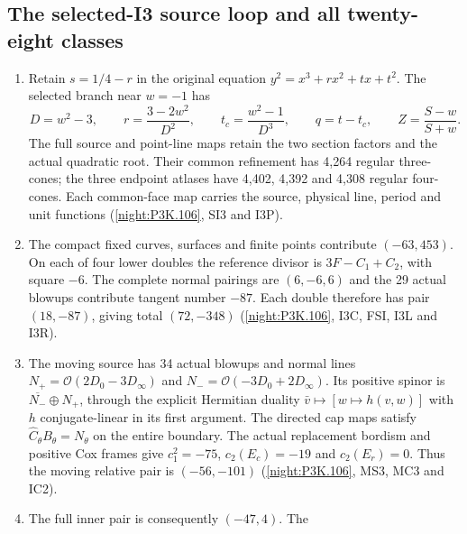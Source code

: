 \subsection{The selected-I3 source loop and all twenty-eight classes}
\RungOne
\begin{enumerate}[label=\arabic*.]
\item Retain $s=1/4-r$ in the original equation
  $y^2=x^3+rx^2+tx+t^2$. The selected branch near $w=-1$ has
  \[
  D=w^2-3,\qquad r=\frac{3-2w^2}{D^2},\qquad
  t_c=\frac{w^2-1}{D^3},\qquad q=t-t_c,
  \qquad Z=\frac{S-w}{S+w}.
  \]
  The full source and point-line maps retain the two section
  factors and the actual quadratic root. Their common refinement
  has 4,264 regular three-cones; the three endpoint atlases have
  4,402, 4,392 and 4,308 regular four-cones. Each common-face
  map carries the source, physical line, period and unit functions
  (\cref{night:P3K.106}, SI3 and I3P).
\item The compact fixed curves, surfaces and finite points
  contribute $(-63,453)$. On each of four lower doubles the
  reference divisor is $3F-C_1+C_2$, with square $-6$.
  The complete normal pairings are $(6,-6,6)$ and the 29 actual
  blowups contribute tangent number $-87$. Each double therefore
  has pair $(18,-87)$, giving total $(72,-348)$
  (\cref{night:P3K.106}, I3C, FSI, I3L and I3R).
\item The moving source has 34 actual blowups and normal lines
  $N_+=\mathcal O(2D_0-3D_\infty)$ and
  $N_-=\mathcal O(-3D_0+2D_\infty)$. Its positive spinor is
  $\overline{N_-}\oplus N_+$, through the explicit Hermitian
  duality $\bar v\mapsto[w\mapsto h(v,w)]$ with $h$
  conjugate-linear in its first argument. The directed cap maps
  satisfy $\widehat C_\theta B_\theta=N_\theta$ on the entire
  boundary. The actual replacement bordism and positive Cox
  frames give $c_1^2=-75$, $c_2(E_c)=-19$ and $c_2(E_r)=0$.
  Thus the moving relative pair is $(-56,-101)$
  (\cref{night:P3K.106}, MS3, MC3 and IC2).
\item The full inner pair is consequently $(-47,4)$. The

\end{enumerate}
